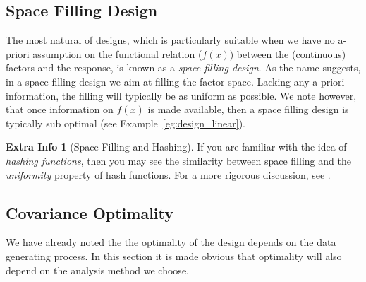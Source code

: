 \documentclass[12pt,a4paper]{report}
\theoremstyle{plain}
\theoremstyle{definition}
\newtheorem{extra}{Extra Info}
\begin{document}
\subsection{Space Filling Design}
\label{sec:space_filling}
The most natural of designs, which is particularly suitable when we have no a-priori assumption on the functional relation ($f(x)$) between the (continuous) factors and the response, is known as a \emph{space filling design}.
As the name suggests, in a space filling design we aim at filling the factor space. Lacking any a-priori information, the filling will typically be as uniform as possible. 
We note however, that once information on $f(x)$ is made available, then a space filling design is typically sub optimal (see Example~\ref{eg:design_linear}).


\begin{extra}[Space Filling and Hashing]
If you are familiar with the idea of \emph{hashing functions}, then you may see the similarity between space filling and the \emph{uniformity} property of hash functions. 
For a more rigorous discussion, see \cite{hill_first_1986}.
\end{extra}



\subsection{Covariance Optimality}
We have already noted the the optimality of the design depends on the data generating process.
In this section it is made obvious that optimality will also depend on the analysis method we choose.
\end{document}

